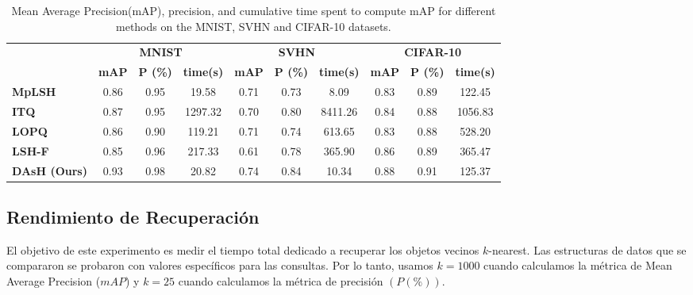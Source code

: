 \begin{table}[!htp]
\caption{Mean Average Precision(mAP), precision, and cumulative time spent to compute mAP for different methods on the MNIST, SVHN  and CIFAR-10 datasets. }
\label{table:map}
\centering
\begin{footnotesize}
\begin{tabular}{l|c|c|c|c|c|c|c|c|c|}
\cline{2-10}
                                           & \multicolumn{3}{c|}{\textbf{MNIST}}            & \multicolumn{3}{c|}{\textbf{SVHN}}             & \multicolumn{3}{c|}{\textbf{CIFAR-10}}         \\ \cline{2-10} 
                                           & \textbf{mAP} & \textbf{P (\%)} & \textbf{time(s)} & \textbf{mAP} & \textbf{P (\%)} & \textbf{time(s)} & \textbf{mAP} & \textbf{P (\%)} & \textbf{time(s)} \\ \hline
\multicolumn{1}{|l|}{\textbf{MpLSH  }}       & 0.86         & 0.95            & \cellcolor[HTML]{c8c8c8}19.58         & 0.71         & 0.73            & 8.09          & \cellcolor[HTML]{c8c8c8}0.83         & 0.89            & \cellcolor[HTML]{c8c8c8}122.45        \\ \hline
\multicolumn{1}{|l|}{\textbf{ITQ  }}         & 0.87         & 0.95            & 1297.32       & 0.70         & 0.80            & 8411.26       & 0.84         & 0.88            & 1056.83       \\ \hline
\multicolumn{1}{|l|}{\textbf{LOPQ  }}        & 0.86         & 0.90            & 119.21        & 0.71         & 0.74            & 613.65        & 0.83         & 0.88            & 528.20        \\ \hline
\multicolumn{1}{|l|}{\textbf{LSH-F  }}       & 0.85         & 0.96            & 217.33        & 0.61         & 0.78            & 365.90        & 0.86         & 0.89            & 365.47        \\ \hline
\multicolumn{1}{|l|}{\textbf{DAsH (Ours)}} & \cellcolor[HTML]{c8c8c8}0.93         & \cellcolor[HTML]{c8c8c8}0.98            & \cellcolor[HTML]{f2f2f2}20.82         & \cellcolor[HTML]{c8c8c8}0.74         & \cellcolor[HTML]{c8c8c8}0.84            & \cellcolor[HTML]{f2f2f2}10.34         & \cellcolor[HTML]{c8c8c8}0.88         & \cellcolor[HTML]{c8c8c8}0.91            & \cellcolor[HTML]{f2f2f2}125.37        \\ \hline
\end{tabular}
\end{footnotesize}
\end{table}
\subsection{Rendimiento de Recuperación} %
El objetivo de este experimento es medir el tiempo total dedicado a recuperar los objetos vecinos $k$-nearest. Las estructuras de datos que se compararon se probaron con valores específicos para las consultas. Por lo tanto, usamos $k = 1000$ cuando calculamos la métrica de Mean Average Precision ($mAP$) y $k = 25$ cuando calculamos la métrica de precisión $ (P(\%))$.

